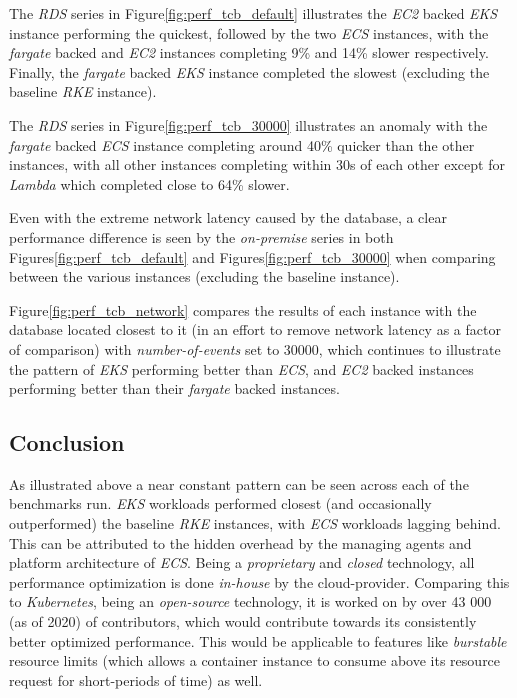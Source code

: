 The \textit{RDS} series in Figure\ref{fig:perf_tcb_default} illustrates the \textit{EC2} backed \textit{EKS} instance performing the quickest,
followed by the two \textit{ECS} instances, with the \textit{fargate} backed and \textit{EC2} instances completing 9\% and 14\% slower respectively.
Finally, the \textit{fargate} backed \textit{EKS} instance completed the slowest (excluding the baseline \textit{RKE} instance).

The \textit{RDS} series in Figure\ref{fig:perf_tcb_30000} illustrates an anomaly with the \textit{fargate} backed \textit{ECS}
instance completing around 40\% quicker than the other instances, with all other instances completing within 30s of each other
except for \textit{Lambda} which completed close to 64\% slower.

Even with the extreme network latency caused by the database, a clear performance difference is seen by the \textit{on-premise} series in both Figures\ref{fig:perf_tcb_default} and Figures\ref{fig:perf_tcb_30000}
when comparing between the various instances (excluding the baseline instance).

Figure\ref{fig:perf_tcb_network} compares the results of each instance with the database located closest to it (in an effort to remove network latency as a factor of comparison) with \textit{number-of-events} set to 30000,
which continues to illustrate the pattern of \textit{EKS} performing better than \textit{ECS},
and \textit{EC2} backed instances performing better than their \textit{fargate} backed instances.


\subsection*{Conclusion}
As illustrated above a near constant pattern can be seen across each of the benchmarks run. \textit{EKS} workloads performed closest (and occasionally outperformed) the baseline \textit{RKE} instances,
with \textit{ECS} workloads lagging behind. This can be attributed to the hidden overhead by the managing agents and platform architecture of \textit{ECS}.
Being a \emph{proprietary} and \emph{closed} technology, all performance optimization is done \emph{in-house} by the cloud-provider.
Comparing this to \textit{Kubernetes}, being an \textit{open-source} technology, it is worked on by over 43 000 (as of 2020)\cite{pittman_2020} of contributors, which would contribute towards its consistently better optimized
performance. This would be applicable to features like \emph{burstable} resource limits (which allows a container instance to consume above its resource request for short-periods of time) as well.

